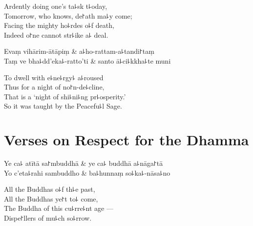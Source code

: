 \begin{english}
  Ardently doing one's ta꜕sk t꜕oday,\\
  Tomorrow, who knows, de꜓ath ma꜕y come;\\
  Facing the mighty ho꜕rdes o꜕f death,\\
  Indeed o꜓ne cannot str꜕ike a꜕ deal.
\end{english}

\begin{twochants}
  Evaṃ vihārim-ātāpiṃ & a꜕ho-rattam-a꜕tandi꜓taṃ \\
  Taṃ ve bha꜕dd'eka꜕-ratto'ti & santo ā꜕ci꜕kkha꜕te muni \\
\end{twochants}


\begin{english}
  To dwell with e꜕ne꜕rgy꜕ a꜕roused\\
  Thus for a night of no꜓n-de꜕cline,\\
  That is a `night of shi꜕ni꜕ng pr꜕osperity.'\\
  So it was taught by the Peacefu꜕l Sage.
\end{english}

\chapter{Verses on Respect for the Dhamma}%



\begin{leader}
\end{leader}

\begin{twochants}
  Ye ca꜕ atītā sa꜓mbuddhā & ye ca꜕ buddhā a꜕nāga꜓tā \\
  Yo c'eta꜕rahi sambuddho & ba꜕hunnaṃ so꜕ka꜕-nāsa꜕no \\
\end{twochants}

\begin{english}
  All the Buddhas o꜕f th꜕e past,\\
  All the Buddhas ye꜓t to꜕ come,\\
  The Buddha of this cu꜕rre꜕nt age ---\\
  Dispe꜓llers of mu꜕ch so꜕rrow.
\end{english}

